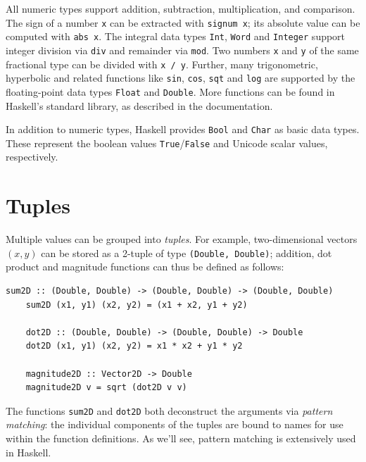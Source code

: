 \documentclass[UdineBachThesis,american,11pt]{PhdThesis}
\begin{document}
  All numeric types support addition, subtraction, multiplication, and
  comparison. The sign of a number \texttt{x} can be extracted with
  \mbox{\texttt{signum x}}; its absolute value can be computed with
  \mbox{\texttt{abs x}}. The integral data types \mbox{\texttt{Int}},
  \mbox{\texttt{Word}} and \mbox{\texttt{Integer}} support integer division via
  \mbox{\texttt{div}} and remainder via \mbox{\texttt{mod}}. Two numbers
  \texttt{x} and \texttt{y} of the same fractional type can be divided with
  \mbox{\texttt{x / y}}. Further, many trigonometric, hyperbolic and related
  functions like \mbox{\texttt{sin}}, \mbox{\texttt{cos}}, \mbox{\texttt{sqt}}
  and \mbox{\texttt{log}} are supported by the floating-point data types
  \mbox{\texttt{Float}} and \mbox{\texttt{Double}}. More functions can be found
  in Haskell's standard library, as described in the documentation.

  In addition to numeric types, Haskell provides \mbox{\texttt{Bool}} and
  \mbox{\texttt{Char}} as basic data types. These represent the boolean values
  \mbox{\texttt{True}}/\mbox{\texttt{False}} and Unicode scalar values,
  respectively.

  \section{Tuples}

  Multiple values can be grouped into \emph{tuples}. For example,
  two-dimensional vectors \mbox{$\left(x, y\right)$} can be stored as a 2-tuple
  of type \mbox{\texttt{(Double, Double)}}; addition, dot product and magnitude
  functions can thus be defined as follows:

  \begin{Verbatim}[gobble=4,fontsize=\small]
    sum2D :: (Double, Double) -> (Double, Double) -> (Double, Double)
    sum2D (x1, y1) (x2, y2) = (x1 + x2, y1 + y2)

    dot2D :: (Double, Double) -> (Double, Double) -> Double
    dot2D (x1, y1) (x2, y2) = x1 * x2 + y1 * y2

    magnitude2D :: Vector2D -> Double
    magnitude2D v = sqrt (dot2D v v)
  \end{Verbatim}

  The functions \mbox{\texttt{sum2D}} and \mbox{\texttt{dot2D}} both deconstruct
  the arguments via \emph{pattern matching}: the individual components of the
  tuples are bound to names for use within the function definitions. As we'll
  see, pattern matching is extensively used in Haskell.
\end{document}
